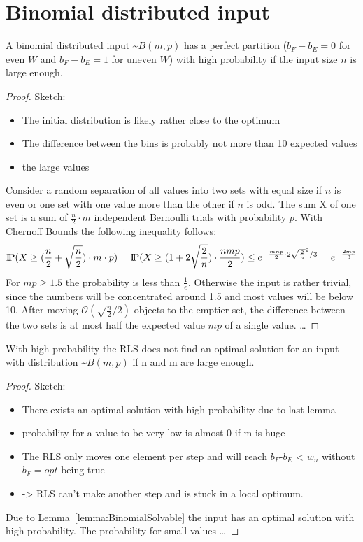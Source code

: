 \section{Binomial distributed input}
\begin{lemma}\label{lemma:BinomialSolvable}
    A binomial distributed input \textasciitilde$B(m,p)$ has a perfect partition ($b_F - b_E = 0$ for even $W$ and $b_F - b_E = 1$ for uneven $W$) with high probability if the input size $n$ is large enough.
\end{lemma}
\begin{proof}
    Sketch:
    \begin{itemize}
        \item The initial distribution is likely rather close to the optimum
        \item The difference between the bins is probably not more than 10 expected values
        \item the large values
    \end{itemize}
    Consider a random separation of all values into two sets with equal size if $n$ is even or one set with one value more than the other if $n$ is odd. The sum X of one set is a sum of $\frac{n}{2}\cdot m$ independent Bernoulli trials with probability $p$. With Chernoff Bounds the following inequality follows:
    \[\text{I\kern-0.15em P}(X\ge(\frac{n}{2}+\sqrt{\frac{n}{2}})\cdot m \cdot p) = \text{I\kern-0.15em P}(X\ge(1+2\sqrt{\frac{2}{n}})\cdot \frac{nmp}{2}) \le e^{-\frac{mnp}{2}\cdot2\sqrt{\frac{2}{n}}^2 /3} = e^{-\frac{2mp}{3}}\]
    For $mp\ge1.5$ the probability is less than $\frac{1}{e}$. Otherwise the input is rather trivial, since the numbers will be concentrated around 1.5 and most values will be below 10.\newline
    After moving $\mathcal{O}(\sqrt{\frac{n}{2}}/2)$ objects to the emptier set, the difference between the two sets is at most half the expected value $mp$ of a single value.
    \dots
\end{proof}


\begin{lemma}
    With high probability the RLS does not find an optimal solution for an input with distribution \textasciitilde$B(m,p)$ if n and m are large enough.
\end{lemma}
\begin{proof}
    Sketch:
    \begin{itemize}
        \item There exists an optimal solution with high probability due to last lemma
        \item probability for a value to be very low is almost 0 if m is huge
        \item The RLS only moves one element per step and will reach $b_F$-$b_E$ < $w_n$ without $b_F= opt$ being true
        \item -> RLS can't make another step and is stuck in a local optimum.
    \end{itemize}
    Due to Lemma~\ref{lemma:BinomialSolvable} the input has an optimal solution with high probability. The probability for small values \dots
\end{proof}